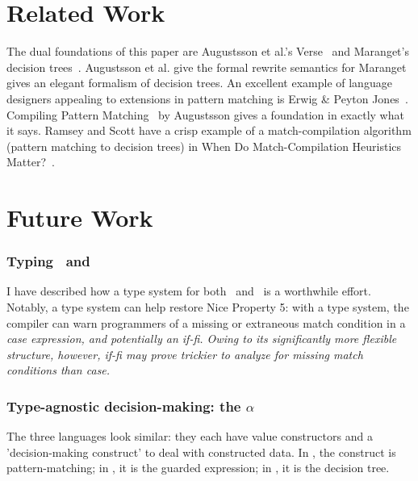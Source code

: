 \documentclass[manuscript,screen,review, 12pt, nonacm]{acmart}
\begin{document}
    \section{Related Work}

    The dual foundations of this paper are Augustsson et al.'s Verse~\citep{verse}
    and Maranget's decision trees~\citep{maranget}. Augustsson et al. give the
    formal rewrite semantics for \VC\; Maranget gives an elegant formalism of
    decision trees. An excellent example of language designers appealing to
    extensions in pattern matching is Erwig \& Peyton Jones~\citep{guardproposal}.
    Compiling Pattern Matching~\citep{augustsson1985compiling} by Augustsson gives
    a foundation in exactly what it says. Ramsey and Scott have a crisp example
    of a match-compilation algorithm (pattern matching to decision trees) in
    When Do Match-Compilation Heuristics Matter?~\citep{scottramsey}. 
    
    \section{Future Work}        
    \label{futurework}
        \subsubsection{Typing \PPlus\ and \VMinus}
        \label{typingppandvm}

        I have described how a type system for both \PPlus\ and \VMinus\ is a
        worthwhile effort. Notably, a type system can help restore Nice Property
        5: with a type system, the compiler can warn programmers of a missing or
        extraneous match condition in a \it{case} expression, and potentially an
        \it{if-fi}. Owing to its significantly more flexible structure, however,
        \it{if-fi} may prove trickier to analyze for missing match conditions
        than \it{case}.

        \subsubsection{Type-agnostic decision-making: the $\alpha$}
        \label{alphas}

        The three languages look similar: they each have value constructors and
        a 'decision-making construct' to deal with constructed data. In \PPlus, the
        construct is pattern-matching; in \VMinus, it is the guarded expression; in \D,
        it is the decision tree. 
\end{document}
